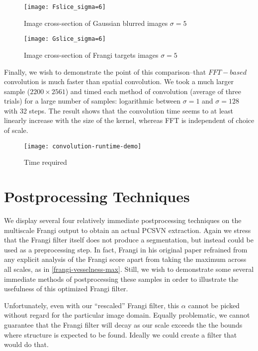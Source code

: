 \begin{figure}
  \centering
  \texttt{[image: Fslice\_sigma=6]}
  \caption{Image cross-section of Gaussian blurred images $\sigma=5$}
  \label{fig:cross-sec-G-sigma=5}
\end{figure}

\begin{figure}
  \centering
  \texttt{[image: Gslice\_sigma=6]}
  \caption{Image cross-section of Frangi targets images $\sigma=5$}
  \label{fig:cross-sec-F-sigma=5}
\end{figure}


Finally, we wish to demonstrate the point of this comparison--that $FFT-based$ convolution is much faster than spatial convolution. We took a much larger sample ($2200 \times 2561$) and timed each method of convolution (average of three trials) for a large number of samples: logarithmic between $\sigma=1$ and $\sigma=128$ with 32 steps. The result shows that the convolution time seems to at least linearly increase with the size of the kernel, whereas FFT is independent of choice of scale.

\begin{figure}
  \texttt{[image: convolution-runtime-demo]}
  \caption{Time required}
\end{figure}

\section{Postprocessing Techniques}
We display several four relatively immediate postprocessing techniques on the multiscale Frangi output to obtain an actual PCSVN extraction. Again we stress that the Frangi filter itself does not produce a segmentation, but instead could be used as a preprocessing step. In fact, Frangi in his original paper \cite{frangi-paper} refrained from any explicit analysis of the Frangi score apart from taking the maximum across all scales, as in \cref{frangi-vesselness-max}. Still, we wish to demonstrate some several immediate methods of postprocessing these samples in order to illustrate the usefulness of this optimized Frangi filter. 

Unfortunately, even with our ``rescaled'' Frangi filter, this $\alpha$ cannot be picked without regard for the particular image domain. Equally problematic, we cannot guarantee that the Frangi filter will decay as our scale exceeds the the bounds where structure is expected to be found. Ideally we could create a filter that would do that.

